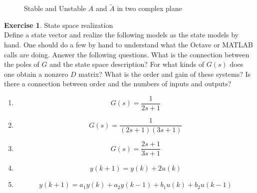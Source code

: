 \documentclass[11pt,a4paper]{report}
\theoremstyle{definition}\newtheorem{exercise}{Exercise}[chapter]
\begin{document}
\begin{answer}
\begin{figure}[htbp]
\begin{tikzpicture}[x=0.75pt,y=0.75pt,yscale=-1,xscale=1]
    
    \end{tikzpicture}
    
    \caption{Stable and Unstable $A$ and $\tilde A$ in two complex plane}
    \label{fig:exer1-9}
    \end{figure}
\end{answer}

\begin{exercise}State space realization\\
Define a state vector and realize the following models as the state models by hand. One should do a few by hand to understand what the Octave or MATLAB calls are doing. Answer the following questions. What is the connection between the poles of $G$ and the state space description? For what kinds of $G(s)$ does one obtain a nonzero $D$ matrix? What is the order and gain of these systems? Is there a connection between order and the numbers of inputs and outputs?
\begin{enumerate}[label=(\alph*)]
    \item $$G(s)=\dfrac{1}{2s+1}$$
    \item $$G(s)=\dfrac{1}{(2s+1)(3s+1)}$$
    \item $$G(s)=\dfrac{2s+1}{3s+1}$$
    \item $$y(k+1)=y(k)+2u(k)$$
    \item $$y(k+1)=a_1 y(k)+a_2 y(k-1)+b_1 u(k)+b_2 u(k-1)$$
\end{enumerate}
\end{exercise}
\end{document}
